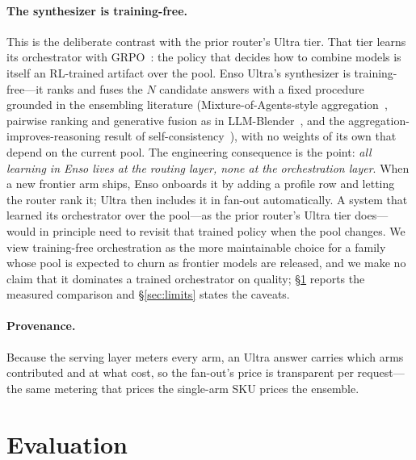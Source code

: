 \documentclass[11pt]{article}
\begin{document}
\paragraph{The synthesizer is training-free.} This is the deliberate contrast with
the prior router's Ultra tier. That tier learns its orchestrator with
GRPO~\cite{grpo}: the policy that decides how to combine models is itself an
RL-trained artifact over the pool. Enso Ultra's synthesizer is training-free---it
ranks and fuses the $N$ candidate answers with a fixed procedure grounded in the
ensembling literature (Mixture-of-Agents-style aggregation~\cite{moa}, pairwise
ranking and generative fusion as in LLM-Blender~\cite{llmblender}, and the
aggregation-improves-reasoning result of self-consistency~\cite{selfconsistency}),
with no weights of its own that depend on the current pool. The engineering
consequence is the point: \emph{all learning in Enso lives at the routing layer,
none at the orchestration layer}. When a new frontier arm ships, Enso onboards it
by adding a profile row and letting the router rank it; Ultra then includes it in
fan-out automatically. A system that learned its orchestrator over the
pool---as the prior router's Ultra tier does---would in principle need to revisit
that trained policy when the pool changes. We view training-free orchestration as
the more maintainable choice for a family whose pool is expected to churn as
frontier models are released, and we make no claim that it dominates a trained
orchestrator on quality; \S\ref{sec:eval} reports the measured comparison and
\S\ref{sec:limits} states the caveats.

\paragraph{Provenance.} Because the serving layer meters every arm, an Ultra answer
carries which arms contributed and at what cost, so the fan-out's price is
transparent per request---the same metering that prices the single-arm SKU prices
the ensemble.

\section{Evaluation}
\label{sec:eval}
\end{document}
